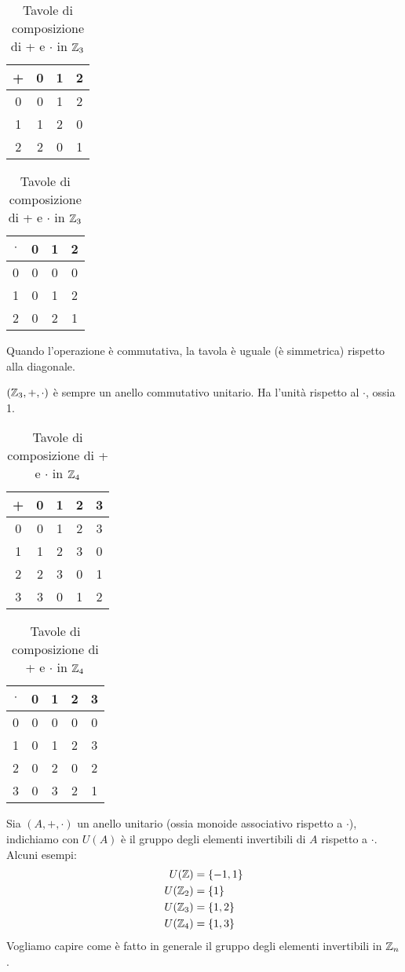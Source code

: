 \begin{table}[ht]
\centering
\begin{tabular}{c|ccc}
+ & 0 & 1 & 2 \\
\hline
0 & 0 & 1 & 2 \\
1 & 1 & 2 & 0 \\
2 & 2 & 0 & 1
\end{tabular}
\qquad
\begin{tabular}{c|ccc}
$\cdot$ & 0 & 1 & 2 \\
\hline
0 & 0 & 0 & 0 \\
1 & 0 & 1 & 2 \\
2 & 0 & 2 & 1
\end{tabular}
\caption{Tavole di composizione di + e $\cdot$ in $\mathbb{Z}_3$}
\end{table}

Quando l'operazione \`e commutativa, la tavola \`e uguale (\`e simmetrica) rispetto alla diagonale.

$(\mathbb{Z}_3, +, \cdot)$ \`e sempre un anello commutativo unitario. Ha l'unit\`a rispetto al $\cdot$, ossia 1.

\begin{table}[ht]
\centering
\begin{tabular}{c|cccc}
+ & 0 & 1 & 2 & 3 \\
\hline
0 & 0 & 1 & 2 & 3 \\
1 & 1 & 2 & 3 & 0 \\
2 & 2 & 3 & 0 & 1 \\
3 & 3 & 0 & 1 & 2
\end{tabular}
\qquad
\begin{tabular}{c|cccc}
$\cdot$ & 0 & 1 & 2 & 3 \\
\hline
0 & 0 & 0 & 0 & 0 \\
1 & 0 & 1 & 2 & 3 \\
2 & 0 & 2 & 0 & 2 \\
3 & 0 & 3 & 2 & 1
\end{tabular}
\caption{Tavole di composizione di + e $\cdot$ in $\mathbb{Z}_4$}
\end{table}

Sia $(A, +, \cdot)$ un anello unitario (ossia monoide associativo rispetto a $\cdot$), indichiamo con $U(A)$ \`e il gruppo degli elementi invertibili di $A$ rispetto a $\cdot$. Alcuni esempi:
\begin{align*}
U(\mathbb{Z}) &= \{ -1, 1 \} \\
U(\mathbb{Z}_2) &= \{ 1 \} \\
U(\mathbb{Z}_3) &= \{ 1,  2 \} \\
U(\mathbb{Z}_4) &= \{1, 3\}
\end{align*}
Vogliamo capire come \`e fatto in generale il gruppo degli elementi invertibili in $\mathbb{Z}_n$.

